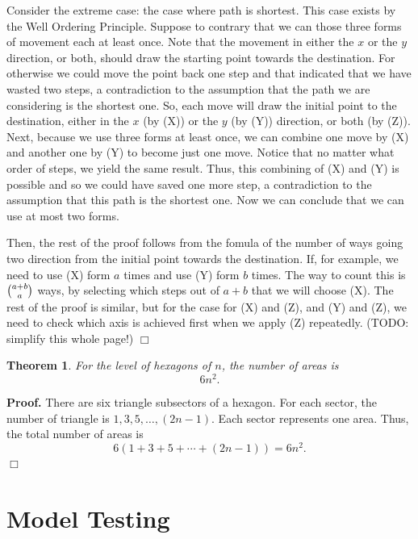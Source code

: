 \documentclass{icmmcm}
\newtheorem{Theo1}{Theorem}
\begin{document}
Consider the extreme case: the case where path is shortest. This case exists by the Well Ordering Principle. Suppose to contrary that we can those three forms of movement each at least once. Note that the movement in either the $x$ or the $y$ direction, or both, should draw the starting point towards the destination. For otherwise we could move the point back one step and that indicated that we have wasted two steps, a contradiction to the assumption that the path we are considering is the shortest one. So, each move will draw the initial point to the destination, either in the $x$ (by (X)) or the $y$ (by (Y)) direction, or both (by (Z)). Next, because we use three forms at least once, we can combine one move by (X) and another one by (Y) to become just one move. Notice that no matter what order of steps, we yield the same result. Thus, this combining of (X) and (Y) is possible and so we could have saved one more step, a contradiction to the assumption that this path is the shortest one. Now we can conclude that we can use at most two forms.

Then, the rest of the proof follows from the fomula of the number of ways going two direction from the initial point towards the destination. If, for example, we need to use (X) form $a$ times and use (Y) form $b$ times. The way to count this is $\tbinom{a+b}{a}$ ways, by selecting which steps out of $a+b$ that we will choose (X). The rest of the proof is similar, but for the case for (X) and (Z), and (Y) and (Z), we need to check which axis is achieved first when we apply (Z) repeatedly. (TODO: simplify this whole page!)
\hfill $\Box$

\begin{Theo1}
For the level of hexagons of $n$, the number of areas is
$$6n^2.$$
\end{Theo1}
{\bf Proof.}
There are six triangle subsectors of a hexagon. For each sector, the number of triangle is $1, 3, 5, \ldots, (2n-1)$. Each sector represents one area. Thus, the total number of areas is
$$6(1+ 3+ 5+\cdots+ (2n-1))=6n^2.$$\hfill $\Box$

\section{Model Testing}
\end{document}
